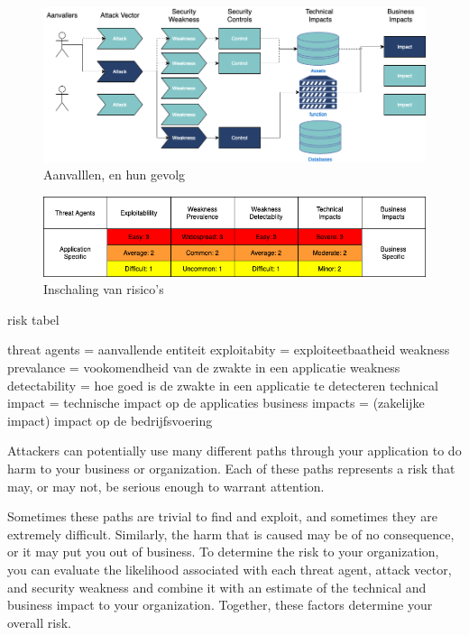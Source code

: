 \begin{figure}[h!]
\myfloatalign
\includegraphics[width=15cm]{gfx/application security routes}
\caption{Aanvalllen, en hun gevolg}
\label{fig:Appliction Security Routes}
\end{figure}



\begin{figure}[h!]
\myfloatalign
\includegraphics[width=12cm]{gfx/risk tabel}
\caption{Inschaling van risico's}
\label{fig:Appliction Security Routes}
\end{figure}

risk tabel

threat agents = aanvallende entiteit
exploitabity = exploiteetbaatheid
weakness prevalance = vookomendheid van de zwakte in een applicatie
weakness detectability = hoe goed is de zwakte in een applicatie te detecteren
technical impact = technische impact op de applicaties
business impacts = (zakelijke impact) impact op de bedrijfsvoering





Attackers can potentially use many different paths through your application to do harm to your business or organization. Each of these paths represents a risk that may, or may not, be serious enough to warrant attention.

 Sometimes these paths are trivial to find and exploit, and sometimes they are extremely difficult. Similarly, the harm that is caused may be of no consequence, or it may put you out of business. To determine the risk to your organization, you can evaluate the likelihood associated with each threat agent, attack vector, and security weakness and combine it with an estimate of the technical and business impact to your organization. Together, these factors determine your overall risk.

